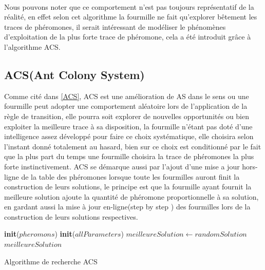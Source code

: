 	\paragraph{}
	Nous pouvons noter que ce comportement n'est pas toujours représentatif de la réalité, en effet selon cet algorithme la fourmille ne fait qu'explorer bêtement les traces de phéromones, il serait intéressant de modéliser le phénomènes d'exploitation de la plus forte trace de phéromone, cela a été introduit grâce à l'algorithme ACS. 
	\newpage
	\subsection{ACS(Ant Colony System)}
	Comme cité dans \ref{ACS}, ACS est une amélioration de AS dans le sens ou une fourmille peut adopter une comportement aléatoire lors de l'application de la règle de transition, elle pourra soit explorer de nouvelles opportunités ou bien exploiter la meilleure trace à sa disposition, la fourmille n'étant pas doté d'une intelligence assez développé pour faire ce choix systématique, elle choisira selon l'instant donné totalement au hasard, bien sur ce choix est conditionné par le fait que la plus part du temps une fourmille choisira la trace de phéromones la plus forte instinctivement. ACS se démarque aussi par l'ajout d'une mise a jour hors-ligne de la table des phéromones lorsque toute les fourmilles auront finit la construction de leurs solutions, le principe est que la fourmille ayant fournit la meilleure solution ajoute la quantité de phéromone proportionnelle à sa solution, en gardant aussi la mise à jour en-ligne(step by step ) des fourmilles lors  de la construction de leurs solutions respectives.
	
	
	\begin{algorithm}[H]
		\SetAlgoLined
		\textbf{init}($pheromons$)\;
		\textbf{init}($allParameters$)
		$meilleureSolution \gets randomSolution$\;
		\Return $meilleureSolution$\;
		\caption{Algorithme de recherche ACS}
	\end{algorithm}
	
